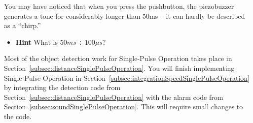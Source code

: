 \begin{description}
\end{description}

\vspace{.5cm}

\begin{description}
\end{description}

\vspace{.5cm}

You may have noticed that when you press the pushbutton, the piezobuzzer generates a tone for considerably longer than 50ms -- it can hardly be described as a ``chirp.''

\begin{description}
        \begin{itemize}
            \item \textbf{Hint} What is $50ms \div 100\mu s$?
        \end{itemize}
\end{description}

\vspace{.5cm}

Most of the object detection work for Single-Pulse Operation takes place in Section~\ref{subsec:distanceSinglePulseOperation}.
You will finish implementing Single-Pulse Operation in Section~\ref{subsec:integrationSpeedSinglePulseOperation} by integrating the detection code from Section~\ref{subsec:distanceSinglePulseOperation} with the alarm code from Section~\ref{subsec:soundSinglePulseOperation}.
This will require small changes to the code.
